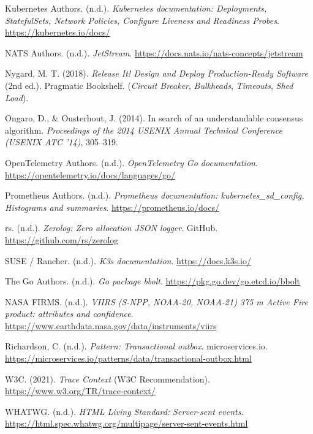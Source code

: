 \begin{list}{}{\leftmargin=1.2cm \itemindent=-1.2cm \itemsep=6pt}
\item Kubernetes Authors. (n.d.). \textit{Kubernetes documentation: Deployments, StatefulSets, Network Policies, Configure Liveness and Readiness Probes}. \url{https://kubernetes.io/docs/}
\item NATS Authors. (n.d.). \textit{JetStream}. \url{https://docs.nats.io/nats-concepts/jetstream}
\item Nygard, M. T. (2018). \textit{Release It! Design and Deploy Production-Ready Software} (2nd ed.). Pragmatic Bookshelf. (\textit{Circuit Breaker}, \textit{Bulkheads}, \textit{Timeouts}, \textit{Shed Load}).
\item Ongaro, D., \& Ousterhout, J. (2014). In search of an understandable consensus algorithm. \textit{Proceedings of the 2014 USENIX Annual Technical Conference (USENIX ATC '14)}, 305--319.
\item OpenTelemetry Authors. (n.d.). \textit{OpenTelemetry Go documentation}. \url{https://opentelemetry.io/docs/languages/go/}
\item Prometheus Authors. (n.d.). \textit{Prometheus documentation: kubernetes\_sd\_config, Histograms and summaries}. \url{https://prometheus.io/docs/}
\item rs. (n.d.). \textit{Zerolog: Zero allocation JSON logger}. GitHub. \url{https://github.com/rs/zerolog}
\item SUSE / Rancher. (n.d.). \textit{K3s documentation}. \url{https://docs.k3s.io/}
\item The Go Authors. (n.d.). \textit{Go package bbolt}. \url{https://pkg.go.dev/go.etcd.io/bbolt}
\item NASA FIRMS. (n.d.). \textit{VIIRS (S-NPP, NOAA-20, NOAA-21) 375 m Active Fire product: attributes and confidence}. \url{https://www.earthdata.nasa.gov/data/instruments/viirs}
\item Richardson, C. (n.d.). \textit{Pattern: Transactional outbox}. microservices.io. \url{https://microservices.io/patterns/data/transactional-outbox.html}
\item W3C. (2021). \textit{Trace Context} (W3C Recommendation). \url{https://www.w3.org/TR/trace-context/}
\item WHATWG. (n.d.). \textit{HTML Living Standard: Server-sent events}. \url{https://html.spec.whatwg.org/multipage/server-sent-events.html}
\end{list}
